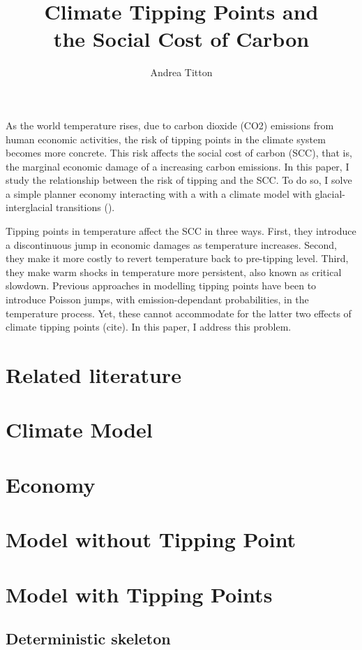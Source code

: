 \documentclass[american, abstract=on]{scrartcl}
\author{Andrea Titton}
\title{Climate Tipping Points and\\the Social Cost of Carbon}
\begin{document}
\maketitle

As the world temperature rises, due to carbon dioxide (CO2) emissions from human economic activities, the risk of tipping points in the climate system becomes more concrete. This risk affects the social cost of carbon (SCC), that is, the marginal economic damage of a increasing carbon emissions. In this paper, I study the relationship between the risk of tipping and the SCC. To do so, I solve a simple planner economy interacting with a with a climate model
with glacial-interglacial transitions (\cite{sellers_global_1969,mcgehee_quadratic_2014}). 


Tipping points in temperature affect the SCC in three ways. First, they introduce a discontinuous jump in economic damages as temperature increases. Second, they make it more costly to revert temperature back to pre-tipping level. Third, they make warm shocks in temperature more persistent, also known as critical slowdown. Previous approaches in modelling tipping points have been to introduce Poisson jumps, with emission-dependant probabilities, in the temperature process. Yet, these cannot accommodate for the latter two effects of climate tipping points (cite). In this paper, I address this problem.




\section{Related literature}
\section{Climate Model}



\section{Economy}



\section{Model without Tipping Point}



\section{Model with Tipping Points}

\subsection{Deterministic skeleton}


\nocite{*}
\newpage
\printbibliography
\end{document}
